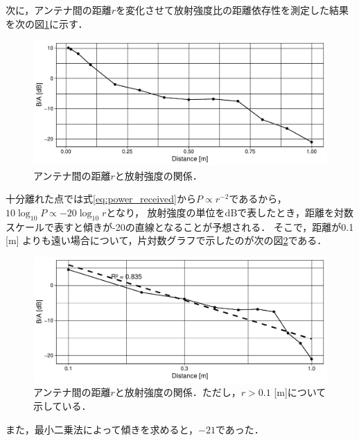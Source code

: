 \documentclass[uplatex,dvipdfmx,a4j,12pt]{jsarticle}
\begin{document}
次に，アンテナ間の距離$r$を変化させて放射強度比の距離依存性を測定した結果を次の図\ref{fig:5-2}に示す．
\begin{figure}[H]
  \centering
  \includegraphics[width=\linewidth]{data/5_2/gain.pdf}
  \caption{アンテナ間の距離$r$と放射強度の関係．}
  \label{fig:5-2}
\end{figure}
十分離れた点では式\eqref{eq:power_received}から$P \propto r ^ {-2}$であるから，$10\log_{10} P \propto -20 \log_{10} r$となり，
放射強度の単位をdBで表したとき，距離を対数スケールで表すと傾きが-20の直線となることが予想される．
そこで，距離が0.1 [m] よりも遠い場合について，片対数グラフで示したのが次の図\ref{fig:5-3}である．
\begin{figure}[H]
    \centering
    \includegraphics[width=\linewidth]{data/5_2/gain2.pdf}
    \caption{アンテナ間の距離$r$と放射強度の関係．ただし，$r> 0.1$ [m]について示している．}
    \label{fig:5-3}
\end{figure}
また，最小二乗法によって傾きを求めると，$-21$であった．
\end{document}
